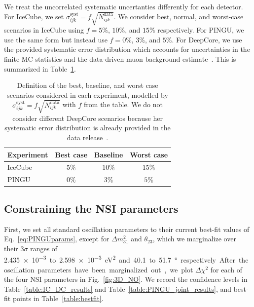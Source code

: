 \documentclass[draft=True]{revtex4-2}
\newcommand{\dm}{\Delta m^2_{31}}
\begin{document}
We treat the uncorrelated systematic uncertanties differently for each detector. For IceCube, we set $\sigma_{ijk}^\text{syst} = f\sqrt{N_{ijk}^\text{data}}$.
We consider best, normal, and worst-case scenarios in IceCube using
$f=5\%$, $10\%$, and $15\%$ respectively. For PINGU, we use the same form but instead use $f=0\%$, $3\%$, and $5\%$. %
For DeepCore, we use the provided systematic error distribution which accounts for uncertainties in the finite MC statistics and the data-driven 
muon background estimate~\cite{DC2019data}. This is summarized in Table~\ref{table:syst_errors}.  %
{\renewcommand{\arraystretch}{1.2}
\begin{table}
   \begin{tabular}{lccc}
      \hline \hline
      Experiment & Best case & Baseline & Worst case \\
      \hline
      IceCube & $5\%$ & $10\%$ & $15\%$ \\
      PINGU & $0\%$ & $3\%$ & $5\%$ \\
      \hline \hline
   \end{tabular}
   \caption{Definition of the best, baseline, and worst case scenarios considered in each experiment, modelled by $\sigma_{ijk}^\text{syst} = f\sqrt{N_{ijk}^\text{data}}$ with $f$ from the table.
   We do not consider different DeepCore scenarios because her systematic error distribution is already provided in the data release~\cite{DC2019data}.}\label{table:syst_errors}
\end{table}

\subsection{Constraining the NSI parameters}
First, we set all standard oscillation parameters to their current best-fit values of Eq.~\ref{eq:PINGUparams}, except for $\dm$ and $\theta_{23}$, 
which we marginalize over their $3\sigma$ ranges of \SI{2.435e-3} to \SI{2.598e-3}{\electronvolt^2} and \SI{40.1} to \SI{51.7}{\degree} respectively. %
After the oscillation parameters have been marginalized out, we plot $\Delta \chi^2$ for each of the four NSI parameters in Fig.~\ref{fig:3D_NO}. We record the 
confidence levels in Table~\ref{table:IC_DC_results} and Table~\ref{table:PINGU_joint_results}, and best-fit points in Table~\ref{table:bestfit}.

}
\end{document}
